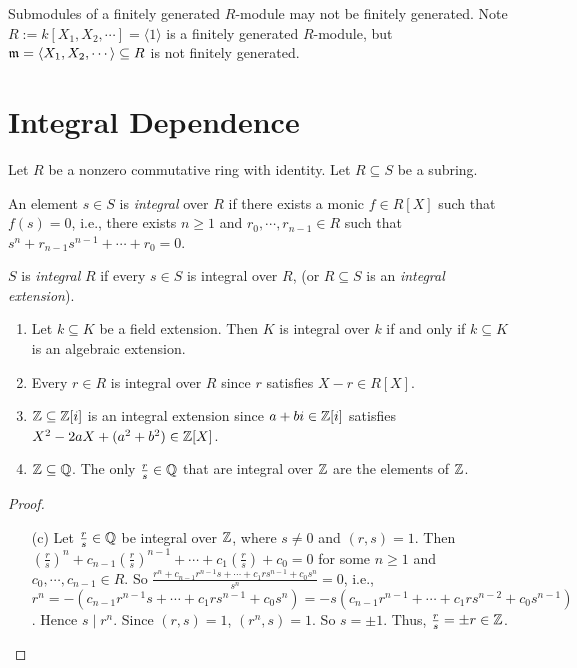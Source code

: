 \begin{example}
    Submodules of a finitely generated $R$-module may not be finitely generated. Note $R := k[X_1,X_2,\cdots] = \langle 1 \rangle$ is a finitely generated $R$-module, but $\mathfrak{m} = \langle X_1,X_2,\cdots \rangle \subseteq R$ is not finitely generated.
\end{example}

\section*{Integral Dependence}

Let $R$ be a nonzero commutative ring with identity. Let $R \subseteq S$ be a subring.

\begin{definition}
    An element $s \in S$ is \emph{integral} over $R$ if there exists a monic $f \in R[X]$ such that $f(s) = 0$, i.e., there exists $n \geq 1$ and $r_0,\cdots,r_{n-1} \in R$ such that $s^{n} + r_{n-1}s^{n-1} + \cdots + r_0 = 0$. \par 
    $S$ is \emph{integral} $R$ if every $s \in S$ is integral over $R$, (or $R \subseteq S$ is an \emph{integral extension}).
\end{definition}

\begin{example}
    \begin{enumerate}
        \item Let $k \subseteq K$ be a field extension. Then $K$ is integral over $k$ if and only if $k \subseteq K$ is an algebraic extension. 
        \item Every $r \in R$ is integral over $R$ since $r$ satisfies $X-r \in R[X]$. 
        \item $\mathbb{Z} \subseteq \mathbb{Z}[i]$ is an integral extension since $a+bi \in \mathbb{Z}[i]$ satisfies $X^{2}-2aX+(a^{2}+b^{2}) \in \mathbb{Z}[X]$.
        \item $\mathbb{Z} \subseteq \mathbb{Q}$. The only $\frac{r}{s} \in \mathbb{Q}$ that are integral over $\mathbb{Z}$ are the elements of $\mathbb{Z}$.
    \end{enumerate}
\end{example}

\begin{proof}
    \begin{enumerate}
        \item[(c)] Let $\frac{r}{s} \in \mathbb{Q}$ be integral over $\mathbb{Z}$, where $s \neq 0$ and $(r,s) = 1$. Then $(\frac{r}{s})^{n} + c_{n-1} (\frac{r}{s})^{n-1} + \cdots + c_1(\frac{r}{s}) + c_0 = 0$ for some $n \geq 1$ and $c_0,\cdots,c_{n-1} \in R$. So $\frac{r^{n} + c_{n-1}r^{n-1}s + \cdots + c_1rs^{n-1} + c_0s^{n}}{s^{n}} = 0$, i.e., $r^{n} = -(c_{n-1}r^{n-1}s + \cdots + c_1r s^{n-1} + c_0s^{n}) = -s(c_{n-1}r^{n-1} + \cdots + c_1rs^{n-2} + c_0s^{n-1})$. Hence $s \mid r^{n}$. Since $(r,s) = 1$, $(r^{n},s) = 1$. So $s = \pm 1$. Thus, $\frac{r}{s} = \pm r \in \mathbb{Z}$. \qedhere
    \end{enumerate}
\end{proof}

